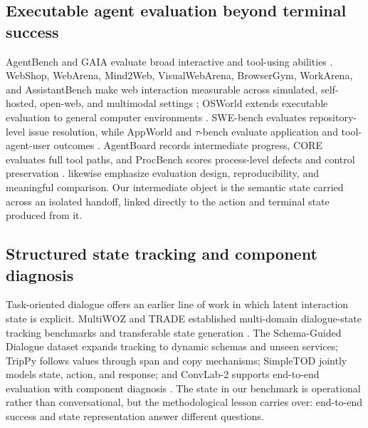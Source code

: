 \documentclass[11pt]{article}
\begin{document}
\subsection{Executable agent evaluation beyond terminal success}

AgentBench and GAIA evaluate broad interactive and tool-using abilities \citep{liu2024agentbench,mialon2024gaia}. WebShop, WebArena, Mind2Web, VisualWebArena, BrowserGym, WorkArena, and AssistantBench make web interaction measurable across simulated, self-hosted, open-web, and multimodal settings \citep{yao2022webshop,zhou2024webarena,deng2023mind2web,koh2024visualwebarena,lesellier2025browsergym,drouin2024workarena,yoran2024assistantbench}; OSWorld extends executable evaluation to general computer environments \citep{xie2024osworld}. SWE-bench evaluates repository-level issue resolution, while AppWorld and \(\tau\)-bench evaluate application and tool-agent-user outcomes \citep{jimenez2024swebench,trivedi2024appworld,yao2025taubench}. AgentBoard records intermediate progress, CORE evaluates full tool paths, and ProcBench scores process-level defects and control preservation \citep{ma2024agentboard,michelakis2025core,he2026procbench}. \citet{kapoor2025agentsmatter} likewise emphasize evaluation design, reproducibility, and meaningful comparison. Our intermediate object is the semantic state carried across an isolated handoff, linked directly to the action and terminal state produced from it.

\subsection{Structured state tracking and component diagnosis}

Task-oriented dialogue offers an earlier line of work in which latent interaction state is explicit. MultiWOZ and TRADE established multi-domain dialogue-state tracking benchmarks and transferable state generation \citep{budzianowski2018multiwoz,wu2019trade}. The Schema-Guided Dialogue dataset expands tracking to dynamic schemas and unseen services; TripPy follows values through span and copy mechanisms; SimpleTOD jointly models state, action, and response; and ConvLab-2 supports end-to-end evaluation with component diagnosis \citep{rastogi2020sgd,heck2020trippy,hossein2020simpletod,zhu2020convlab}. The state in our benchmark is operational rather than conversational, but the methodological lesson carries over: end-to-end success and state representation answer different questions.
\end{document}
